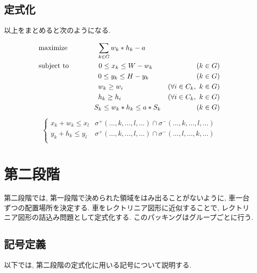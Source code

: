 \subsection{定式化}
以上をまとめると次のようになる. \\
\begin{center}
    \begin{align}
        & \textrm{maximize} \hspace{1.5cm}
        \sum_{k \in G} w_k*h_k - a \\
        & \textrm{subject\ to} \hspace{1.5cm}
        0 \leq x_k \leq W - w_k & (k \in G) \\
        &\hspace{3cm} 0 \leq y_k \leq H - y_k & (k \in G) \\
        &\hspace{3cm} w_k \geq w_i & (\forall i \in C_k, \ k \in G) \\
        &\hspace{3cm} h_k \geq h_i & (\forall i \in C_k, \ k \in G) \\
        &\hspace{2.8cm} S_k \leq w_k*h_k \leq a*S_k &(k \in G)
    \end{align}
    \begin{eqnarray}
        \hspace{2cm} \left\{
            \begin{array}{ll}
                x_k + w_k \leq x_l & \sigma^+(\ldots,k,\ldots,l,\ldots) \cap \sigma^-(\ldots,k,\ldots,l,\ldots) \\
                y_k + h_k \leq y_l & \sigma^+(\ldots,k,\ldots,l,\ldots) \cap \sigma^-(\ldots,l,\ldots,k,\ldots) \\
            \end{array}
        \hspace{2cm} \right.
    \end{eqnarray}
\end{center}

\section{第二段階}
第二段階では, 第一段階で決められた領域をはみ出ることがないように, 車一台ずつの配置場所を決定する. 
車をレクトリニア図形\cite{nfp2}に近似することで, レクトリニア図形の詰込み問題として定式化する. 
このパッキングはグループごとに行う. 

\subsection{記号定義}
以下では, 第二段階の定式化に用いる記号について説明する. 

